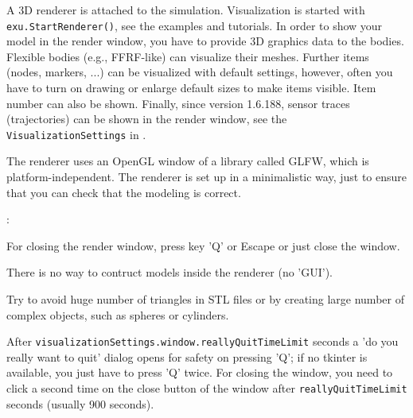 A 3D renderer is attached to the simulation. Visualization is started with  \texttt{exu.StartRenderer()}, see the examples and tutorials.
In order to show your model in the render window, you have to provide 3D graphics data to the bodies. Flexible bodies (e.g., FFRF-like) can visualize their meshes. Further items (nodes, markers, ...) can be visualized with default settings, however, often you have to turn on drawing or enlarge default sizes to make items visible. Item number can also be shown.
Finally, since version 1.6.188, sensor traces (trajectories) can be shown in the render window, see the \texttt{VisualizationSettings} in  .

The renderer uses an OpenGL window of a library called GLFW, which is platform-independent. 
The renderer is set up in a minimalistic way, just to ensure that you can check that the modeling is correct. 

\noindent {}:
\bi
  \item For closing the render window, press key 'Q' or Escape or just close the window.
  \item There is no way to contruct models inside the renderer (no 'GUI').
  \item Try to avoid huge number of triangles in STL files or by creating large number of complex objects, such as spheres or cylinders.
  \item After \texttt{visualizationSettings.window.reallyQuitTimeLimit} seconds a 'do you really want to quit' dialog opens for safety on pressing 'Q'; if no tkinter is available, you just have to press 'Q' twice. For closing the window, you need to click a second time on the close button of the window after \texttt{reallyQuitTimeLimit} seconds (usually 900 seconds).
\ei
 
